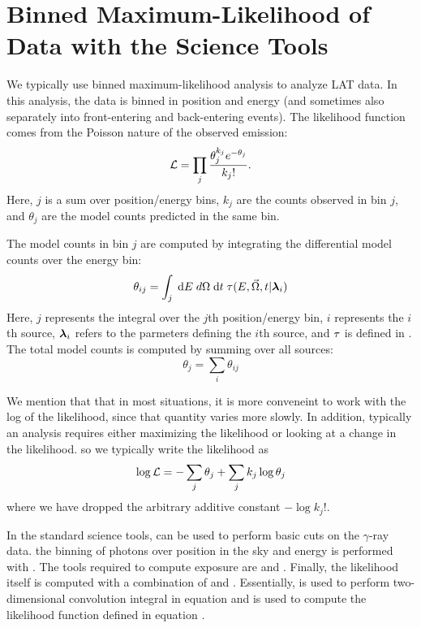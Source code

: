 \section{Binned Maximum-Likelihood of  Data with the Science Tools}

We typically use binned maximum-likelihood analysis to analyze \ac{LAT}
data.  In this analysis, the data is binned in position and energy (and
sometimes also separately into front-entering and back-entering events).
The likelihood function comes from the Poisson nature of the observed
emission:
\begin{equation}\eqnlabel{poisson_likelihood_counts_model}
  \likelihood=\prod_j \frac{\theta_j^{k_j} e^{-\theta_j}}{k_j!}.
\end{equation}
Here, $j$ is a sum over position/energy bins,
$k_j$ are the counts observed in bin $j$, and 
$\theta_j$ are the model counts predicted in the same bin.


The model counts in bin $j$ are computed by integrating the differential
model counts over the energy bin:
  \begin{equation}
    \theta_{ij} = \int_j \; \text{d}E \; 
    d\Omega \; \text{d}t \; 
    \tau(E,\vec\Omega,t|\boldsymbol{\lambda}_i)
  \end{equation}
Here, $j$ represents the integral over the $j$th position/energy bin,
$i$ represents the $i$th source, $\boldsymbol{\lambda}_i$ refers to the
parmeters defining the $i$th source,
and $\tau$ is defined in  
. The total model counts
is computed by summing over all sources:
\begin{equation}
  \theta_j = \sum_i \theta_{ij}
\end{equation}

We mention that that in most situations, it is more conveneint to work
with the log of the likelihood, since that quantity varies more slowly.
In addition, typically an analysis requires either 
maximizing the likelihood or looking at a change in the likelihood.
so we
typically write
the likelihood as
\begin{equation}\eqnlabel{log_likelihood_sum_theta}
  \log\likelihood = -\sum_j\theta_j + \sum_j k_j\log\theta_j 
\end{equation}
where we have dropped the arbitrary additive constant $-\log k_j!$.

In the standard \fermi science tools, \gtbin can be used to perform
basic cuts on the $\gamma$-ray data.  the binning of photons over
position in the sky and energy is performed with \gtbin.  The tools
required to compute exposure are \gtltcube and \gtexpcubetwo. Finally,
the likelihood itself is computed with a combination of \gtsrcmaps and
\gtlike.  Essentially, \gtsrcmaps is used to perform two-dimensional
convolution integral in equation  and
\gtlike is used to compute the likelihood function defined in equation
.

